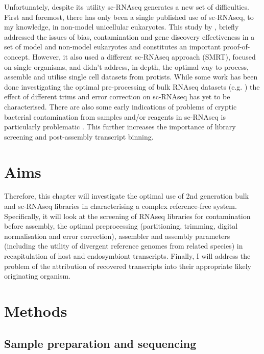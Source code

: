 Unfortunately, despite its utility sc-RNAseq generates a new set of difficulties.
First and foremost, there has only been a single published use of sc-RNAseq, to my knowledge, in non-model unicellular eukaryotes.   
This study by \citep{Kolisko2014}, briefly addressed the issues of bias, contamination and gene discovery effectiveness in a set of model and non-model eukaryotes and
constitutes an important proof-of-concept.  
However, it also used a different sc-RNAseq approach (SMRT), focused on single organisms, 
and didn't address, in-depth, the optimal way to process, assemble and utilise single cell datasets from protists.
While some work has been done investigating the optimal pre-processing of bulk RNAseq datasets (e.g. \citet{Macmanes2013,Macmanes2015}) 
the effect of different trims and error correction on sc-RNAseq has yet to be characterised.  
There are also some early indications of problems of cryptic bacterial contamination
from samples and/or reagents in sc-RNAseq is particularly problematic \citep{Kolisko2014}. 
This further increases the importance of library screening and post-assembly transcript binning.

\section{Aims}
Therefore, this chapter will investigate the optimal use of 2nd generation bulk and sc-RNAseq libraries
in characterising a complex reference-free system.  Specifically, it will look at the screening of RNAseq libraries for contamination
before assembly, the optimal preprocessing (partitioning, trimming, digital normalisation and error correction), assembler and assembly
parameters (including the utility of divergent reference genomes from related species) in recapitulation of host and endosymbiont transcripts.
Finally, I will address the problem of the attribution of recovered transcripts into their appropriate likely originating organism.  
\section{Methods} 

\subsection{Sample preparation and sequencing}

